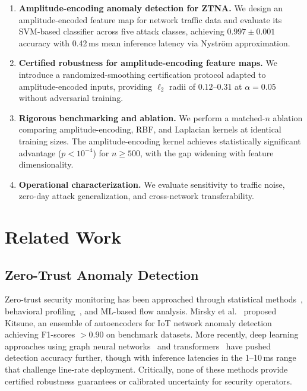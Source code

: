 \documentclass[twocolumn,a4paper,11pt]{article}
\begin{document}
\begin{enumerate}[leftmargin=*,itemsep=2pt]
  \item \textbf{Amplitude-encoding anomaly detection for ZTNA.} We design an
    amplitude-encoded feature map for network traffic data and evaluate its
    SVM-based classifier across five attack classes, achieving $0.997 \pm 0.001$
    accuracy with 0.42\,ms mean inference latency via Nystr\"om approximation.

  \item \textbf{Certified robustness for amplitude-encoding feature maps.} We
    introduce a randomized-smoothing certification protocol adapted to
    amplitude-encoded inputs, providing $\ell_2$ radii of $0.12$--$0.31$ at
    $\alpha = 0.05$ without adversarial training.

  \item \textbf{Rigorous benchmarking and ablation.} We perform a matched-$n$
    ablation comparing amplitude-encoding, RBF, and Laplacian kernels at identical
    training sizes. The amplitude-encoding kernel achieves statistically
    significant advantage ($p < 10^{-4}$) for $n \geq 500$, with the gap widening
    with feature dimensionality.

  \item \textbf{Operational characterization.} We evaluate sensitivity to traffic
    noise, zero-day attack generalization, and cross-network transferability.
\end{enumerate}

\section{Related Work}
\label{sec:related}

\subsection{Zero-Trust Anomaly Detection}

Zero-trust security monitoring has been approached through statistical
methods~\cite{ashraf2020zero}, behavioral profiling~\cite{wang2021user}, and
ML-based flow analysis. Mirsky et al.~\cite{mirsky2018kitsune} proposed Kitsune, an
ensemble of autoencoders for IoT network anomaly detection achieving
F1-scores $> 0.90$ on benchmark datasets. More recently, deep learning approaches
using graph neural networks~\cite{zhou2020graph} and transformers~\cite{wu2022transformer}
have pushed detection accuracy further, though with inference latencies in the 1--10\,ms
range that challenge line-rate deployment. Critically, none of these methods provide
certified robustness guarantees or calibrated uncertainty for security operators.
\end{document}

